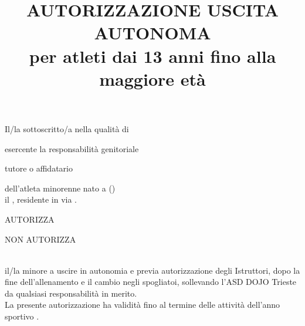\documentclass{djtsmod}
\title{AUTORIZZAZIONE USCITA AUTONOMA\\[10pt] \normalsize per atleti dai 13 anni fino alla maggiore età}
\begin{document}
	\maketitle
	
	Il/la sottoscritto/a \fieldfill\; nella qualità di
	\begin{radiolist}
		\item esercente la responsabilità genitoriale  
		\item tutore o affidatario
	\end{radiolist}
	dell'atleta minorenne \fieldfill\; nato a \field{1.5in} (\field{0.5in}) \\
	il \field{1.5in}, residente in \field{2in} via \fieldfill.
	
	\vspace{0.5in}
	\begin{radiolist}
		\item AUTORIZZA
		\item NON AUTORIZZA
	\end{radiolist}\ \\
	il/la minore a uscire in autonomia e previa autorizzazione degli Istruttori, dopo la fine dell'allenamento e il cambio negli spogliatoi, sollevando l'ASD DOJO Trieste da qualsiasi responsabilità in merito. \\[20px]
	
	La presente autorizzazione ha validità fino al termine delle attività dell'anno sportivo \field{1.5in}.
	
	\vspace{1in}
	
\end{document}
